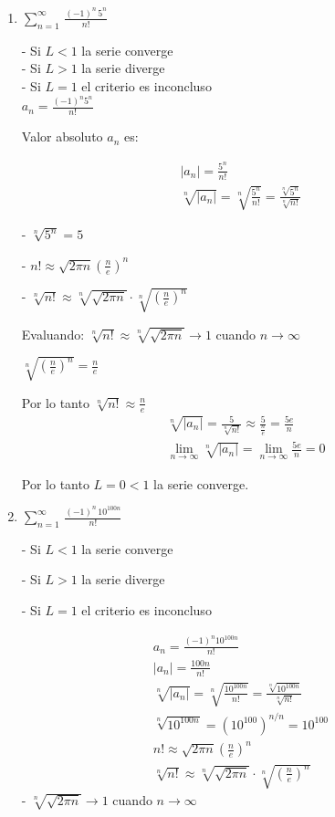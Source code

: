 \documentclass{article}
\begin{document}
\begin{enumerate}
\begin{enumerate}
\item $\displaystyle\sum_{n=1}^{\infty}\,\frac{(-1)^n\,5^n}{n!}$


- Si $L<1$ la serie converge\\
- Si $L>1$ la serie diverge\\
- Si $L=1$ el criterio es inconcluso\\


$a_n=\frac{(-1)^n 5^n}{n!}$


Valor absoluto $a_n$ es:


$$
\begin{gathered}
\left|a_n\right|=\frac{5^n}{n!} \\
\sqrt[n]{\left|a_n\right|}=\sqrt[n]{\frac{5^n}{n!}}=\frac{\sqrt[n]{5^n}}{\sqrt[n]{n!}}
\end{gathered}
$$

- $\sqrt[n]{5^n}=5$

- $n!\approx \sqrt{2 \pi n}\left(\frac{n}{e}\right)^n$

- $\sqrt[n]{n!} \approx \sqrt[n]{\sqrt{2 \pi n}} \cdot \sqrt[n]{\left(\frac{n}{e}\right)^n}$

Evaluando:
$\sqrt[n]{n!} \approx \sqrt[n]{\sqrt{2 \pi n}} \rightarrow 1$ cuando $n \rightarrow \infty$


$\sqrt[n]{\left(\frac{n}{e}\right)^n}=\frac{n}{e}$


Por lo tanto
$\sqrt[n]{n!} \approx \frac{n}{e}$
$$
\begin{aligned}
& \sqrt[n]{\left|a_n\right|}=\frac{5}{\sqrt[n]{n!}} \approx \frac{5}{\frac{n}{e}}=\frac{5 e}{n} \\
& \lim _{n \rightarrow \infty} \sqrt[n]{\left|a_n\right|}=\lim _{n \rightarrow \infty} \frac{5 e}{n}=0
\end{aligned}
$$

Por lo tanto $L=0<1$ la serie converge.
\newpage
\item $\displaystyle\sum_{n=1}^{\infty}\,\frac{(-1)^n\,10^{100n}}{n!}$

- Si $L<1$ la serie converge

- Si $L>1$ la serie diverge

- Si $L=1$ el criterio es inconcluso

$$
\begin{gathered}
a_n=\frac{(-1)^n 10^{100 n}}{n!} \\
\left|a_n\right|=\frac{100 n}{n!} \\
\sqrt[n]{\left|a_n\right|}=\sqrt[n]{\frac{10^{100 n}}{n!}}=\frac{\sqrt[n]{10^{100 n}}}{\sqrt[n]{n!}} \\
\sqrt[n]{10^{100 n}}=\left(10^{100}\right)^{n / n}=10^{100} \\
n!\approx \sqrt{2 \pi n}\left(\frac{n}{e}\right)^n \\
\sqrt[n]{n!} \approx \sqrt[n]{\sqrt{2 \pi n}} \cdot \sqrt[n]{\left(\frac{n}{e}\right)^n}
\end{gathered}
$$
- $\sqrt[n]{\sqrt{2 \pi n}} \rightarrow 1$ cuando $n \rightarrow \infty$



\end{enumerate}
\end{enumerate}
\end{document}
